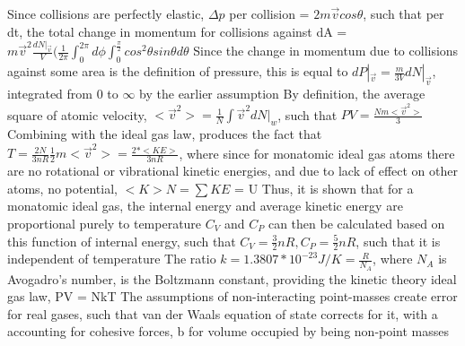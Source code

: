 \begin{outline*}
\1 Since collisions are perfectly elastic, $\Delta p$ per collision = $2m\vec{v}cos\theta$, such that per dt, the total change in momentum for collisions against dA = $m\vec{v}^2\frac{dN|_\vec{v}}{V}(\frac{1}{2\pi}\int^{2\pi}_0 d\phi \int^{\frac{\pi}{2}}_0 cos^2\theta sin\theta d\theta$
\2 Since the change in momentum due to collisions against some area is the definition of pressure, this is equal to $dP|_\vec{v} = \frac{m}{3V}dN|_\vec{v}$, integrated from 0 to $\infty$ by the earlier assumption
\2 By definition, the average square of atomic velocity, $<\vec{v}^2> = \frac{1}{N}\int \vec{v}^2 dN|_w$, such that $PV = \frac{Nm<\vec{v}^2>}{3}$
\2 Combining with the ideal gas law, produces the fact that $T = \frac{2N}{3nR}\frac{1}{2}m<\vec{v}^2> = \frac{2*<KE>}{3nR}$, where since for monatomic ideal gas atoms there are no rotational or vibrational kinetic energies, and due to lack of effect on other atoms, no potential, $<K>N = \sum KE$ = U
\3 Thus, it is shown that for a monatomic ideal gas, the internal energy and average kinetic energy are proportional purely to temperature
\3 $C_V$ and $C_P$ can then be calculated based on this function of internal energy, such that $C_V = \frac{3}{2}nR, C_P = \frac{5}{2}nR$, such that it is independent of temperature
\3 The ratio $k = 1.3807 * 10^{-23} J/K = \frac{R}{N_A}$, where $N_A$ is Avogadro's number, is the Boltzmann constant, providing the kinetic theory ideal gas law, PV = NkT
\1 The assumptions of non-interacting point-masses create error for real gases, such that van der Waals equation of state corrects for it, with a accounting for cohesive forces, b for volume occupied by being non-point masses
\end{outline*}

